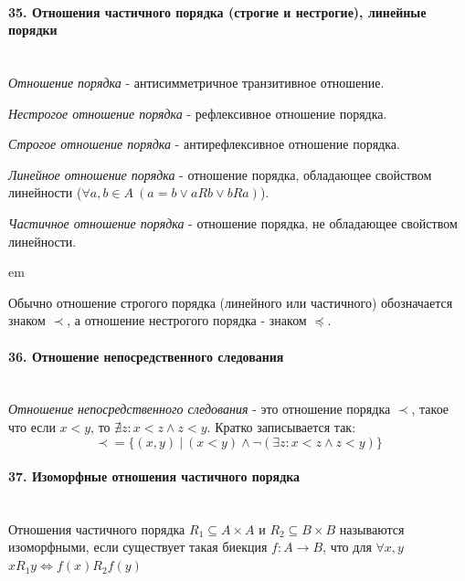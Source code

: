 \documentclass[a4paper, 12pt]{article}
\newcommand{\parag}[1]{\paragraph{#1}\mbox{}\\}
\begin{document}
\parag{35. Отношения частичного порядка (строгие и нестрогие), линейные порядки}
\textit{Отношение порядка} - антисимметричное транзитивное отношение.

\noindent
\textit{Нестрогое отношение порядка} - рефлексивное отношение порядка.

\noindent
\textit{Строгое отношение порядка} - антирефлексивное отношение порядка.

\noindent
\textit{Линейное отношение порядка} - отношение порядка, обладающее свойством линейности ($\forall a, b \in A\ (a = b \lor aRb \lor bRa)$).

\noindent
\textit{Частичное отношение порядка} - отношение порядка, не обладающее свойством линейности.

 em

Обычно отношение строгого порядка (линейного или частичного) обозначается знаком $\prec$, а отношение нестрогого порядка - знаком $\preceq$.

\parag{36. Отношение непосредственного следования}
\textit{Отношение непосредственного следования} - это отношение порядка $\prec$, такое что если $x < y$, то $\nexists z: x < z \land z < y$. Кратко записывается так:
\[
    \prec = \{(x, y)\ |\ (x < y) \land \neg(\exists z: x < z \land z < y)\}
\]

\parag{37. Изоморфные отношения частичного порядка}
Отношения частичного порядка $R_{1} \subseteq A \times A$ и $R_{2} \subseteq B \times B$ называются изоморфными, если существует такая биекция $f : A \rightarrow B$, что для $\forall x, y$ $xR_{1}y \iff f(x)R_{2}f(y)$
\end{document}
